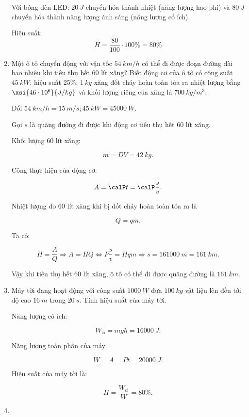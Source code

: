 \begin{enumerate}[label=\bfseries Câu \arabic*:]
	\hideall
	{	
		Với bóng đèn LED: $\SI{20}{J}$ chuyển hóa thành nhiệt (năng lượng hao phí) và $\SI{80}{J}$ chuyển hóa thành năng lượng ánh sáng (năng lượng có ích).
		
		Hiệu suất: $$H = \dfrac{80}{100} \cdot 100\% = 80\%$$
	}
	\item {}
	
	
	{
		Một ô tô chuyển động với vận tốc $\SI{54}{km/h}$ có thể đi được đoạn đường dài bao nhiêu khi tiêu thụ hết 60 lít xăng? Biết động cơ của ô tô có công suất $\SI{45}{kW}$; hiệu suất $25\%$; $\SI{1}{kg}$ xăng đốt cháy hoàn toàn tỏa ra nhiệt lượng bằng $\xsi{46\cdot 10^6}{J/kg}$ và khối lượng riêng của xăng là $\SI{700}{kg/m^3}$.
	}
	
	\hideall
	{	
		Đổi $\SI{54}{km/h} = \SI{15}{m/s}; \SI{45}{kW} = \SI{45000}{W}.$
		
		Gọi $s$ là quãng đường đi được khi động cơ tiêu thụ hết 60 lít xăng.
		
		Khối lượng 60 lít xăng:
		
		$$m = DV = \SI{42}{kg}.$$
		
		Công thực hiện của động cơ:
		
		$$A = \calP t = \calP \dfrac{s}{v}.$$
		
		Nhiệt lượng do 60 lít xăng khi bị đốt cháy hoàn toàn tỏa ra là 
		
		$$Q = qm.$$
		
		Ta có:
		
		$$H = \dfrac{A}{Q} \Rightarrow A = HQ  \Leftrightarrow P \dfrac{s}{v} = Hqm \Rightarrow s = \SI{161000}{m} = \SI{161}{km}.$$
		
		Vậy khi tiêu thụ hết 60 lít xăng, ô tô có thể đi được quãng đường là $\SI{161}{km}.$
	}
	\item {}
	
	
	{
		Máy tời đang hoạt động với công suất $\SI{1000}{W}$ đưa $\SI{100}{kg}$ vật liệu lên đều tới độ cao $\SI{16}{m}$ trong $\SI{20}{s}$. Tính hiệu suất của máy tời.
	}
	
	\hideall
	{	
		Năng lượng có ích:
		
		$$W_\text{ci} = mgh = \SI{16000}{J}.$$
		
		Năng lượng toàn phần của máy
		
		$$W = A = Pt = \SI{20000}{J}.$$
		
		Hiệu suất của máy tời là:
		
		$$H =\dfrac{W_\text{ci}}{W} = 80\%.$$
	}


	\item {}
	

\end{enumerate}
